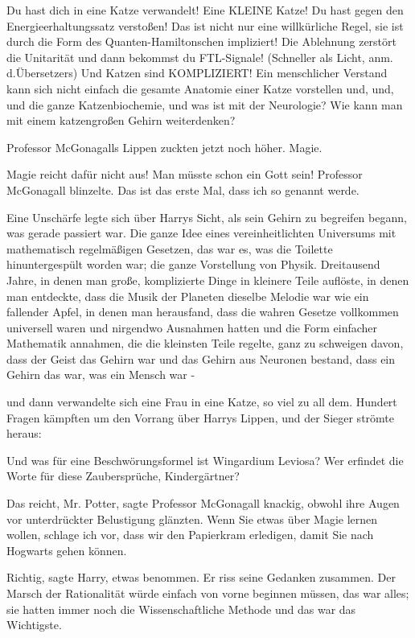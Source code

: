 \glqq{}Du hast dich in eine Katze verwandelt! Eine KLEINE Katze! Du hast gegen
den Energieerhaltungssatz verstoßen! Das ist nicht nur eine willkürliche Regel,
sie ist durch die Form des Quanten-Hamiltonschen impliziert! Die Ablehnung
zerstört die Unitarität und dann bekommst du FTL-Signale! (Schneller als Licht,
anm. d.Übersetzers) Und Katzen sind KOMPLIZIERT! Ein menschlicher Verstand kann
sich nicht einfach die gesamte Anatomie einer Katze vorstellen und, und, und die
ganze Katzenbiochemie, und was ist mit der Neurologie? Wie kann man mit einem
katzengroßen Gehirn weiterdenken?\grqq{}

Professor McGonagalls Lippen zuckten jetzt noch höher. \glqq{}Magie.\grqq{}

\glqq{}Magie reicht dafür nicht aus! Man müsste schon ein Gott sein!\grqq{}
Professor McGonagall blinzelte. \glqq{}Das ist das erste Mal, dass ich so
genannt werde.\grqq{}

Eine Unschärfe legte sich über Harrys Sicht, als sein Gehirn zu begreifen
begann, was gerade passiert war. Die ganze Idee eines vereinheitlichten
Universums mit mathematisch regelmäßigen Gesetzen, das war es, was die Toilette
hinuntergespült worden war; die ganze Vorstellung von Physik. Dreitausend Jahre,
in denen man große, komplizierte Dinge in kleinere Teile auflöste, in denen man
entdeckte, dass die Musik der Planeten dieselbe Melodie war wie ein fallender
Apfel, in denen man herausfand, dass die wahren Gesetze vollkommen universell
waren und nirgendwo Ausnahmen hatten und die Form einfacher Mathematik annahmen,
die die kleinsten Teile regelte, ganz zu schweigen davon, dass der Geist das
Gehirn war und das Gehirn aus Neuronen bestand, dass ein Gehirn das war, was ein
Mensch war -

und dann verwandelte sich eine Frau in eine Katze, so viel zu all dem. Hundert
Fragen kämpften um den Vorrang über Harrys Lippen, und der Sieger strömte
heraus:

\glqq{}Und was für eine Beschwörungsformel ist Wingardium Leviosa? Wer erfindet
die Worte für diese Zaubersprüche, Kindergärtner?\grqq{}

\glqq{}Das reicht, Mr. Potter\grqq{}, sagte Professor McGonagall knackig, obwohl
ihre Augen vor unterdrückter Belustigung glänzten. \glqq{}Wenn Sie etwas über
Magie lernen wollen, schlage ich vor, dass wir den Papierkram erledigen, damit
Sie nach Hogwarts gehen können.\grqq{}

\glqq{}Richtig\grqq{}, sagte Harry, etwas benommen. Er riss seine Gedanken
zusammen. Der Marsch der Rationalität würde einfach von vorne beginnen müssen,
das war alles; sie hatten immer noch die Wissenschaftliche Methode und das war
das Wichtigste.

